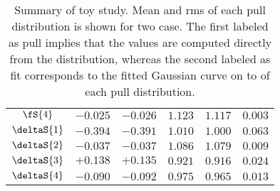 \begin{table}
\begin{tabular}{c c c c c | c}
    $                   \fS{4}$ & $-0.025$ & $-0.026$ & $1.123$ & $1.117$  & $0.003$ \\
    $               \deltaS{1}$ & $-0.394$ & $-0.391$ & $1.010$ & $1.000$  & $0.063$ \\
    $               \deltaS{2}$ & $-0.037$ & $-0.037$ & $1.086$ & $1.079$  & $0.009$ \\
    $               \deltaS{3}$ & $+0.138$ & $+0.135$ & $0.921$ & $0.916$  & $0.024$ \\
    $               \deltaS{4}$ & $-0.090$ & $-0.092$ & $0.975$ & $0.965$  & $0.013$ \\
  \end{tabular}
  \caption{Summary of toy study. Mean and rms of each pull distribution is shown for two case.
           The first labeled as pull implies that the values are computed directly from the distribution,
           whereas the second labeled as fit corresponds to the fitted Gaussian curve on to of each pull distribution.}
  \label{pull_table}
\end{table}
